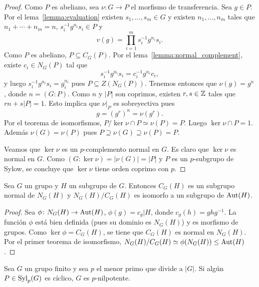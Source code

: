 \begin{proof}
	Como $P$ es abeliano, sea $\nu\colon G\to P$ el morfismo de transferencia.
	Sea $g\in P$.  Por el lema~\ref{lemma:evaluation} existen $s_1,\dots,s_m\in
	G$ y existen $n_1,\dots,n_m$ tales que $n_1+\cdots+n_m=n$,
	$s_i^{-1}g^{n_i}s_i\in P$ y 
	\[
		v(g)=\prod_{i=1}^m s_i^{-1}g^{n_i}s_i.
	\]
	Como $P$ es abeliano, $P\subseteq C_G(P)$. Por 
	el lema~\ref{lemma:normal_complement}, existe $c_i\in N_G(P)$ tal
	que 
	\[
	s_i^{-1}g^{n_i}s_i=c_i^{-1}g^{n_i}c_i,
	\]
	y luego $s_i^{-1}g^{n_i}s_i=g_i^{n_i}$ pues $P\subseteq Z(N_G(P))$. Tenemos
	entonces que $\nu(g)=g^n$, donde $n=(G:P)$. Como $n$ y $|P|$ son coprimos,
	existen $r,s\in\mathbb{Z}$ tales que $rn+s|P|=1$. Esto implica que $\nu|_P$ es
	sobreyectiva pues
	\[
	g=(g^r)^n=\nu(g^r).
	\]
	Por el teorema de isomorfismos, $P/\ker\nu\cap P\simeq\nu(P)=P$. 
	Luego $\ker\nu\cap P=1$. Además $\nu(G)=\nu(P)$ pues 
	$P\supseteq \nu(G)\supseteq \nu(P)=P$.
	
	Veamos que $\ker\nu$ es un $p$-complemento normal en $G$. Es claro que $\ker\nu$ es normal en $G$. 
	Como $(G:\ker\nu)=|\nu(G)|=|P|$ y $P$ es un $p$-subgrupo de Sylow, se concluye que $\ker\nu$ tiene orden coprimo con $p$.
\end{proof}



\begin{lemma}
	\label{lemma:NC}
	Sea $G$ un grupo y $H$ un subgrupo de $G$. Entonces $C_G(H)$ es un subgrupo
	normal de $N_G(H)$ y $N_G(H)/C_G(H)$ es isomorfo a un subgrupo de
	$\operatorname{Aut}(H)$.
\end{lemma}

\begin{proof}
	Sea $\phi\colon N_G(H)\to\operatorname{Aut}(H)$,  $\phi(g)=c_g|H$, donde
	$c_g(h)=ghg^{-1}$.  La función $\phi$ está bien definida (pues su dominio
	es $N_G(H)$) y es morfismo de grupos. Como $\ker\phi=C_G(H)$, se tiene que
	$C_G(H)$ es normal en $N_G(H)$. Por el primer teorema de isomorfismo,
	$N_G(H)/C_G(H)\simeq\phi(N_G(H))\leq\operatorname{Aut}(H)$.
\end{proof}

\begin{corollary}
	\label{corollary:Sylow_ciclico}
	Sea $G$ un grupo finito y sea $p$ el menor primo que divide a $|G|$. Si
	algún $P\in\mathrm{Syl}_p(G)$ es cíclico, $G$ es $p$-nilpotente.
\end{corollary}

